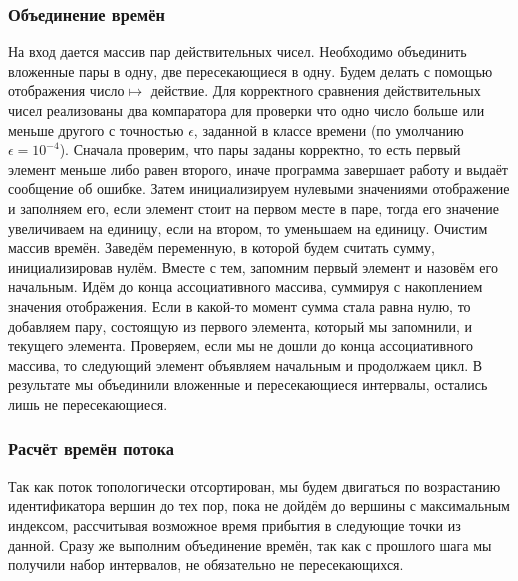 \documentclass[12pt, a4 paper]{article}
\theoremstyle{plain}
\begin{document}


\subsubsection*{Объединение времён}

На вход дается массив пар действительных чисел. Необходимо объединить вложенные пары в одну, две пересекающиеся в одну. Будем делать с помощью отображения число$\mapsto$ действие. Для корректного сравнения действительных чисел реализованы два компаратора для проверки что одно число больше или меньше другого с точностью $\epsilon$, заданной в классе времени (по умолчанию $\epsilon = 10^{-4}$). Сначала проверим, что пары заданы корректно, то есть первый элемент меньше либо равен второго, иначе программа завершает работу и выдаёт сообщение об ошибке. Затем инициализируем нулевыми значениями отображение и заполняем его, если элемент стоит на первом месте в паре, тогда его значение увеличиваем на единицу, если на втором, то уменьшаем на единицу. Очистим массив времён. Заведём переменную, в которой будем считать сумму, инициализировав нулём. Вместе с тем, запомним первый элемент и назовём его начальным. Идём до конца ассоциативного массива, суммируя с накоплением значения отображения. Если в какой-то момент сумма стала равна нулю, то добавляем пару, состоящую из первого элемента, который мы запомнили, и текущего элемента. Проверяем, если мы не дошли до конца ассоциативного массива, то следующий элемент объявляем начальным и продолжаем цикл. В результате мы объединили вложенные и пересекающиеся интервалы, остались лишь не пересекающиеся.




\subsubsection*{Расчёт времён потока}


Так как поток топологически отсортирован, мы будем двигаться по возрастанию идентификатора вершин до тех пор, пока не дойдём до вершины с максимальным индексом, рассчитывая возможное время прибытия в следующие точки из данной. Сразу же выполним объединение времён, так как с прошлого шага мы получили набор интервалов, не обязательно не пересекающихся. 
\end{document}
